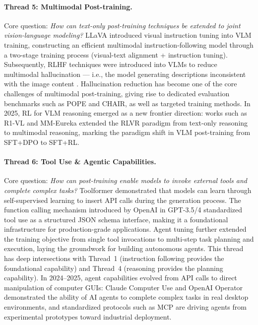 \paragraph{Thread 5: Multimodal Post-training.}
Core question: \textit{How can text-only post-training techniques be extended to joint vision-language modeling?}
LLaVA \cite{liu2023llava} introduced visual instruction tuning into VLM training,
constructing an efficient multimodal instruction-following model
through a two-stage training process (visual-text alignment + instruction tuning).
Subsequently, RLHF techniques were introduced into VLMs to reduce multimodal hallucination ---
i.e., the model generating descriptions inconsistent with the image content
\cite{sun2023rlhfv,yu2024rlhfv}.
Hallucination reduction has become one of the core challenges of multimodal post-training,
giving rise to dedicated evaluation benchmarks such as POPE \cite{li2023pope}
and CHAIR, as well as targeted training methods.
In 2025, RL for VLM reasoning emerged as a new frontier direction:
works such as R1-VL \cite{zhang2025r1vl} and MM-Eureka \cite{meng2025mmeureka}
extended the RLVR paradigm from text-only reasoning to multimodal reasoning,
marking the paradigm shift in VLM post-training from SFT+DPO to SFT+RL.

\paragraph{Thread 6: Tool Use \& Agentic Capabilities.}
Core question: \textit{How can post-training enable models to invoke external tools and complete complex tasks?}
Toolformer \cite{schick2023toolformer} demonstrated that models can learn through self-supervised learning
to insert API calls during the generation process.
The function calling mechanism introduced by OpenAI in GPT-3.5/4
standardized tool use as a structured JSON schema interface,
making it a foundational infrastructure for production-grade applications.
Agent tuning \cite{zeng2023agenttuning} further extended the training objective from single tool invocations
to multi-step task planning and execution, laying the groundwork for building autonomous agents.
This thread has deep intersections with Thread~1 (instruction following provides the foundational capability)
and Thread~4 (reasoning provides the planning capability).
In 2024--2025, agent capabilities evolved from API calls to direct manipulation of computer GUIs:
Claude Computer Use \cite{anthropic2024computeruse} and OpenAI Operator \cite{openai2025operator}
demonstrated the ability of AI agents to complete complex tasks in real desktop environments,
and standardized protocols such as MCP \cite{anthropic2024mcp} are driving agents from experimental prototypes toward industrial deployment.

